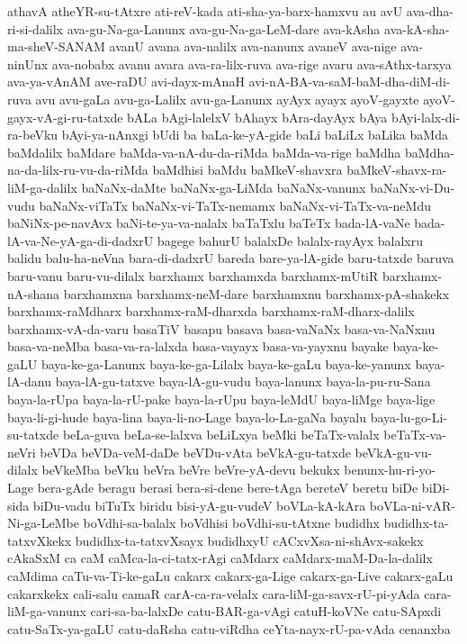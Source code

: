 {athavA
atheYR-su-tAtxre
ati-reV-kada
ati-sha-ya-barx-hamxvu
au
avU
ava-dha-ri-si-dalilx
ava-gu-Na-ga-Lanunx
ava-gu-Na-ga-LeM-dare
ava-kAsha
ava-kA-sha-ma-sheV-SANAM
avanU
avana
ava-nalilx
ava-nanunx
avaneV
ava-nige
ava-ninUnx
ava-nobabx
avanu
avara
ava-ra-lilx-ruva
ava-rige
avaru
ava-sAthx-tarxya
ava-ya-vAnAM
ave-raDU
avi-dayx-mAnaH
avi-nA-BA-va-saM-baM-dha-diM-di-ruva
avu
avu-gaLa
avu-ga-Lalilx
avu-ga-Lanunx
ayAyx
ayayx
ayoV-gayxte
ayoV-gayx-vA-gi-ru-tatxde
bALa
bAgi-lalelxV
bAhayx
bAra-dayAyx
bAya
bAyi-lalx-di-ra-beVku
bAyi-ya-nAnxgi
bUdi
ba
baLa-ke-yA-gide
baLi
baLiLx
baLika
baMda
baMdalilx
baMdare
baMda-va-nA-du-da-riMda
baMda-va-rige
baMdha
baMdha-na-da-lilx-ru-vu-da-riMda
baMdhisi
baMdu
baMkeV-shavxra
baMkeV-shavx-ra-liM-ga-dalilx
baNaNx-daMte
baNaNx-ga-LiMda
baNaNx-vanunx
baNaNx-vi-Du-vudu
baNaNx-viTaTx
baNaNx-vi-TaTx-nemamx
baNaNx-vi-TaTx-va-neMdu
baNiNx-pe-navAvx
baNi-te-ya-va-nalalx
baTaTxlu
baTeTx
bada-lA-vaNe
bada-lA-va-Ne-yA-ga-di-dadxrU
bagege
bahurU
balalxDe
balalx-rayAyx
balalxru
balidu
balu-ha-neVna
bara-di-dadxrU
bareda
bare-ya-lA-gide
baru-tatxde
baruva
baru-vanu
baru-vu-dilalx
barxhamx
barxhamxda
barxhamx-mUtiR
barxhamx-nA-shana
barxhamxna
barxhamx-neM-dare
barxhamxnu
barxhamx-pA-shakekx
barxhamx-raMdharx
barxhamx-raM-dharxda
barxhamx-raM-dharx-dalilx
barxhamx-vA-da-varu
basaTiV
basapu
basava
basa-vaNaNx
basa-va-NaNxnu
basa-va-neMba
basa-va-ra-lalxda
basa-vayayx
basa-va-yayxnu
bayake
baya-ke-gaLU
baya-ke-ga-Lanunx
baya-ke-ga-Lilalx
baya-ke-gaLu
baya-ke-yanunx
baya-lA-danu
baya-lA-gu-tatxve
baya-lA-gu-vudu
baya-lanunx
baya-la-pu-ru-Sana
baya-la-rUpa
baya-la-rU-pake
baya-la-rUpu
baya-leMdU
baya-liMge
baya-lige
baya-li-gi-hude
baya-lina
baya-li-no-Lage
baya-lo-La-gaNa
bayalu
baya-lu-go-Li-su-tatxde
beLa-guva
beLa-se-lalxva
beLiLxya
beMki
beTaTx-valalx
beTaTx-va-neVri
beVDa
beVDa-veM-daDe
beVDu-vAta
beVkA-gu-tatxde
beVkA-gu-vu-dilalx
beVkeMba
beVku
beVra
beVre
beVre-yA-devu
bekukx
benunx-hu-ri-yo-Lage
bera-gAde
beragu
berasi
bera-si-dene
bere-tAga
bereteV
beretu
biDe
biDi-sida
biDu-vadu
biTuTx
biridu
bisi-yA-gu-vudeV
boVLa-kA-kAra
boVLa-ni-vAR-Ni-ga-LeMbe
boVdhi-sa-balalx
boVdhisi
boVdhi-su-tAtxne
budidhx
budidhx-ta-tatxvXkekx
budidhx-ta-tatxvXsayx
budidhxyU
cACxvXsa-ni-shAvx-sakekx
cAkaSxM
ca
caM
caMca-la-ci-tatx-rAgi
caMdarx
caMdarx-maM-Da-la-dalilx
caMdima
caTu-va-Ti-ke-gaLu
cakarx
cakarx-ga-Lige
cakarx-ga-Live
cakarx-gaLu
cakarxkekx
cali-salu
camaR
carA-ca-ra-velalx
cara-liM-ga-savx-rU-pi-yAda
cara-liM-ga-vanunx
cari-sa-ba-lalxDe
catu-BAR-ga-vAgi
catuH-koVNe
catu-SApxdi
catu-SaTx-ya-gaLU
catu-daRsha
catu-viRdha
ceYta-nayx-rU-pa-vAda
cenanxba
}
